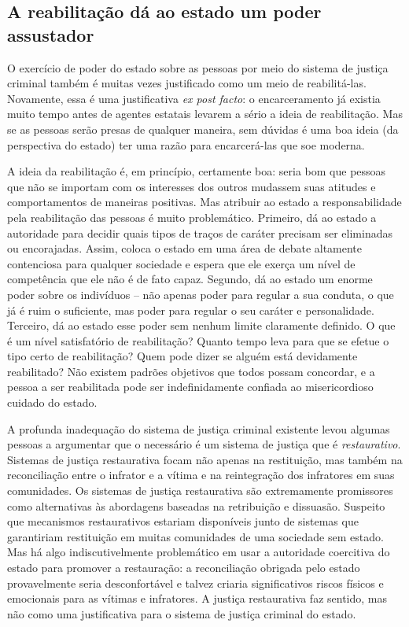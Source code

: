\subsection*{A reabilitação dá ao estado um poder assustador}

O exercício de poder do estado sobre as pessoas por meio do sistema de justiça criminal também é muitas vezes justificado como um meio de reabilitá-las. Novamente, essa é uma justificativa \emph{ex post facto}: o encarceramento já existia muito tempo antes de agentes estatais levarem a sério a ideia de reabilitação. Mas se as pessoas serão presas de qualquer maneira, sem dúvidas é uma boa ideia (da perspectiva do estado) ter uma razão para encarcerá-las que soe moderna.

A ideia da reabilitação é, em princípio, certamente boa: seria bom que pessoas que não se importam com os interesses dos outros mudassem suas atitudes e comportamentos de maneiras positivas. Mas atribuir ao estado a responsabilidade pela reabilitação das pessoas é muito problemático. Primeiro, dá ao estado a autoridade para decidir quais tipos de traços de caráter precisam ser eliminadas ou encorajadas. Assim, coloca o estado em uma área de debate altamente contenciosa para qualquer sociedade e espera que ele exerça um nível de competência que ele não é de fato capaz. Segundo, dá ao estado um enorme poder sobre os indivíduos -- não apenas poder para regular a sua conduta, o que já é ruim o suficiente, mas poder para regular o seu caráter e personalidade. Terceiro, dá ao estado esse poder sem nenhum limite claramente definido. O que é um nível satisfatório de reabilitação? Quanto tempo leva para que se efetue o tipo certo de reabilitação? Quem pode dizer se alguém está devidamente reabilitado? Não existem padrões objetivos que todos possam concordar, e a pessoa a ser reabilitada pode ser indefinidamente confiada ao misericordioso cuidado do estado.

A profunda inadequação do sistema de justiça criminal existente levou algumas pessoas a argumentar que o necessário é um sistema de justiça que é \emph{restaurativo}. Sistemas de justiça restaurativa focam não apenas na restituição, mas também na reconciliação entre o infrator e a vítima e na reintegração dos infratores em suas comunidades. Os sistemas de justiça restaurativa são extremamente promissores como alternativas às abordagens baseadas na retribuição e dissuasão. Suspeito que mecanismos restaurativos estariam disponíveis junto de sistemas que garantiriam restituição em muitas comunidades de uma sociedade sem estado. Mas há algo indiscutivelmente problemático em usar a autoridade coercitiva do estado para promover a restauração: a reconciliação obrigada pelo estado provavelmente seria desconfortável e talvez criaria significativos riscos físicos e emocionais para as vítimas e infratores. A justiça restaurativa faz sentido, mas não como uma justificativa para o sistema de justiça criminal do estado.

